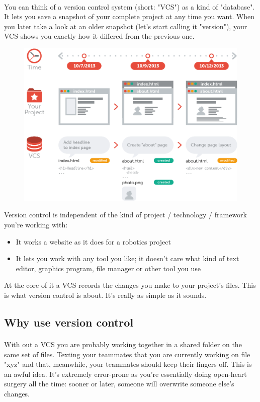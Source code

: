 \documentclass{article}
\begin{document}
\paragraph{}
    You can think of a version control system (short: "VCS") as a kind of "database". It lets you save a snapshot of your complete project at any time you want. When you later take a look at an older snapshot (let's start calling it "version"), your VCS shows you exactly how it differed from the previous one.
    \begin{figure}[hp]
    \centering
    \includegraphics[width=4.5in]{images/what_is_vcs.png}
    \end{figure}
    
    Version control is independent of the kind of project / technology / framework you're working with:
    \begin{itemize}
        \item It works a website as it does for a robotics project
        \item It lets you work with any tool you like; it doesn't care what kind of text editor, graphics program, file manager or other tool you use
    \end{itemize}

    At the core of it a VCS records the changes you make to your project's files. This is what version control is about. It's really as simple as it sounds.
\subsection{Why use version control}
    \paragraph{}
    With out a VCS you are probably working together in a shared folder on the same set of files. Texting your teammates that you are currently working on file "xyz" and that, meanwhile, your teammates should keep their fingers off. This is an awful idea. It's extremely error-prone as you're essentially doing open-heart surgery all the time: sooner or later, someone will overwrite someone else's changes.
\end{document}
